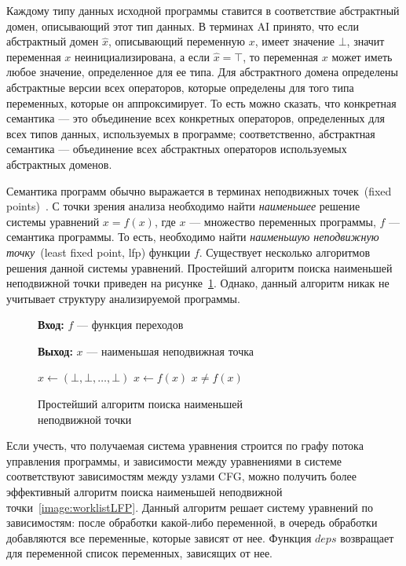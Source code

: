 Каждому типу данных исходной программы ставится в соответствие абстрактный
домен, описывающий этот тип данных. В терминах AI принято, что если абстрактный
домен $\hat{x}$, описывающий переменную $x$, имеет значение $\bot$, значит 
переменная $x$ неинициализирована, а если $\hat{x} = \top$, то переменная $x$
может иметь любое значение, определенное для ее типа. Для абстрактного домена
определены абстрактные версии всех операторов, которые определены для того
типа переменных, которые он аппроксимирует. То есть можно сказать, что 
конкретная семантика --- это объединение всех конкретных операторов, 
определенных для всех типов данных, используемых в программе; соответственно,
абстрактная семантика --- объединение всех абстрактных операторов используемых 
абстрактных доменов.

Семантика программ обычно выражается в терминах неподвижных точек~(fixed 
points)~\cite{fixedPoint}. С точки зрения анализа необходимо найти
\emph{наименьшее} решение системы уравнений $x = f(x)$, где $x$ --- множество
переменных программы, $f$ --- семантика программы. То есть, необходимо найти
\emph{наименьшую неподвижную точку}~(least fixed point, lfp) функции $f$.
Существует несколько алгоритмов решения данной системы уравнений. Простейший 
алгоритм поиска наименьшей неподвижной точки приведен на 
рисунке~\ref{image:nativeLFP}. Однако, данный алгоритм никак не учитывает 
структуру анализируемой программы.

\begin{figure}[h!]
\textbf{Вход:} $f$ --- функция переходов

\textbf{Выход:} $x$ --- наименьшая неподвижная точка

\begin{algorithmic} 
\State $x \gets (\bot, \bot, \ldots, \bot)$ 
\Repeat 
	\State $x \gets f(x)$ 
\Until $x \ne f(x)$ 
\end{algorithmic}

\caption{Простейший алгоритм поиска наименьшей\\неподвижной точки}
\label{image:nativeLFP}
\end{figure}

Если учесть, что получаемая система уравнения строится по графу потока 
управления программы, и зависимости между уравнениями в системе соответствуют
зависимостям между узлами CFG, можно получить более эффективный алгоритм поиска
наименьшей неподвижной точки~\ref{image:worklistLFP}. Данный алгоритм решает
систему уравнений по зависимостям: после обработки какой-либо переменной,
в очередь обработки добавляются все переменные, которые зависят от нее. Функция
$deps$ возвращает для переменной список переменных, зависящих от нее.

